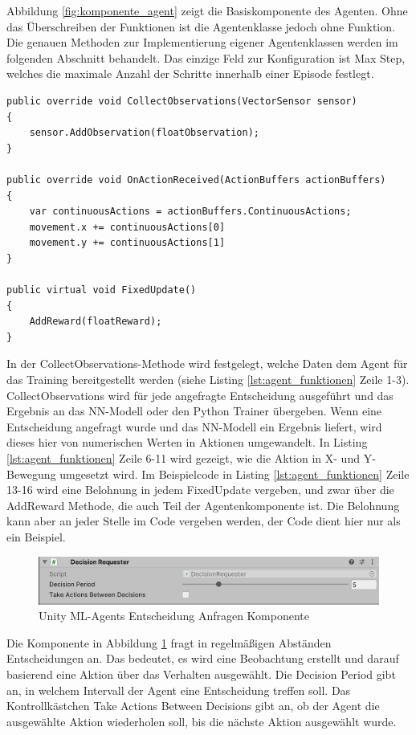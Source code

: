 Abbildung \ref{fig:komponente_agent} zeigt die Basiskomponente des Agenten. Ohne das Überschreiben der Funktionen ist die Agentenklasse jedoch ohne Funktion. Die genauen Methoden zur Implementierung eigener Agentenklassen werden im folgenden Abschnitt behandelt. Das einzige Feld zur Konfiguration ist \grqq{}Max Step\grqq{}, welches die maximale Anzahl der Schritte innerhalb einer Episode festlegt.

\begin{lstlisting}[caption={Agent Funktionen},captionpos=b,label={lst:agent_funktionen}]
public override void CollectObservations(VectorSensor sensor)
{
    sensor.AddObservation(floatObservation);
}

public override void OnActionReceived(ActionBuffers actionBuffers)
{
    var continuousActions = actionBuffers.ContinuousActions;
    movement.x += continuousActions[0]
    movement.y += continuousActions[1]
}

public virtual void FixedUpdate()
{
    AddReward(floatReward);
}
\end{lstlisting}

In der CollectObservations-Methode wird festgelegt, welche Daten dem Agent für das Training bereitgestellt werden (siehe Listing \ref{lst:agent_funktionen} Zeile 1-3). CollectObservations wird für jede angefragte Entscheidung ausgeführt und das Ergebnis an das NN-Modell oder den Python Trainer übergeben. Wenn eine Entscheidung angefragt wurde und das NN-Modell ein Ergebnis liefert, wird dieses hier von numerischen Werten in Aktionen umgewandelt. In Listing \ref{lst:agent_funktionen} Zeile 6-11 wird gezeigt, wie die Aktion in X- und Y-Bewegung umgesetzt wird. Im Beispielcode in Listing \ref{lst:agent_funktionen} Zeile 13-16 wird eine Belohnung in jedem FixedUpdate vergeben, und zwar über die AddReward Methode, die auch Teil der Agentenkomponente ist. Die Belohnung kann aber an jeder Stelle im Code vergeben werden, der Code dient hier nur als ein Beispiel.

\begin{figure}[H]
  \centering  
  \includegraphics[scale=0.5]{img/komponente_decision_requester}
  \caption{Unity ML-Agents Entscheidung Anfragen Komponente}
  \label{fig:komponente_decision_requester}
\end{figure}

Die Komponente in Abbildung \ref{fig:komponente_decision_requester} fragt in regelmäßigen Abständen Entscheidungen an. Das bedeutet, es wird eine Beobachtung erstellt und darauf basierend eine Aktion über das Verhalten ausgewählt. Die \grqq{}Decision Period\grqq{} gibt an, in welchem Intervall der Agent eine Entscheidung treffen soll. Das Kontrollkästchen \grqq{}Take Actions Between Decisions\grqq{} gibt an, ob der Agent die ausgewählte Aktion wiederholen soll, bis die nächste Aktion ausgewählt wurde.